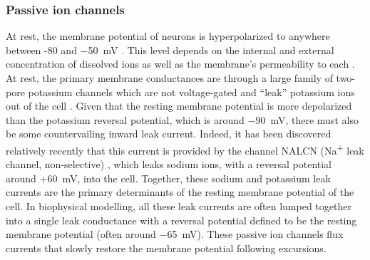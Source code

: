 \subsubsection{Passive ion channels} \label{sec:I_L}
At rest, the membrane potential of neurons is hyperpolarized to anywhere between -80 and \qty{-50}{\milli\volt} \cite{Ren2011}. This level depends on the internal and external concentration of dissolved ions as well as the membrane's permeability to each \cite{Hodgkin1949}. At rest, the primary membrane conductances are through a large family of two-pore potassium channels \cite{Goldstein2005,Ren2011} which are not voltage-gated and ``leak'' potassium ions out of the cell \cite{Goldstein2001}. Given that the resting membrane potential is more depolarized than the potassium reversal potential, which is around \qty{-90}{\milli\volt}, there must also be some countervailing inward leak current. Indeed, it has been discovered relatively recently that this current is provided by the channel NALCN (Na\textsuperscript{+} leak channel, non-selective) \cite{Ren2011}, which leaks sodium ions, with a reversal potential around  +\qty{60}{\milli\volt}, into the cell. Together, these sodium and potassium leak currents are the primary determinants of the resting membrane potential of the cell. In biophysical modelling, all these leak currents are often lumped together into a single leak conductance with a reversal potential defined to be the resting membrane potential (often around \qty{-65}{\milli\volt}). These passive ion channels flux currents that slowly restore the membrane potential following excursions.

